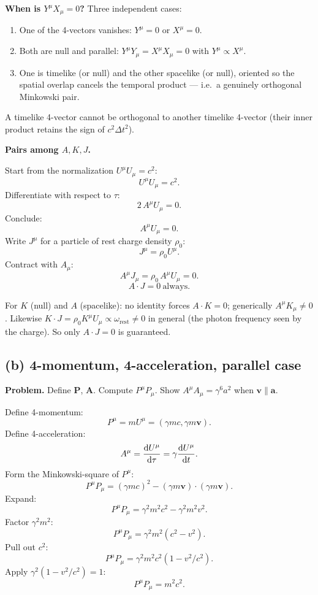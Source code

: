 \documentclass[11pt]{article}
\begin{document}
\noindent\textbf{When is $Y^\mu X_\mu=0$?} Three independent cases:
\begin{enumerate}
\item One of the 4-vectors vanishes: $Y^\mu=0$ or $X^\mu=0$.
\item Both are null and parallel: $Y^\mu Y_\mu = X^\mu X_\mu = 0$ with $Y^\mu \propto X^\mu$.
\item One is timelike (or null) and the other spacelike (or null), oriented so the spatial overlap cancels the temporal product --- i.e.\ a genuinely orthogonal Minkowski pair.
\end{enumerate}
A timelike 4-vector cannot be orthogonal to another timelike 4-vector (their inner product retains the sign of $c^2\Delta t^2$).

\noindent\textbf{Pairs among $A,K,J$.}

Start from the normalization $U^\mu U_\mu=c^2$:
\[ U^\mu U_\mu = c^2. \]
Differentiate with respect to $\tau$:
\[ 2\,A^\mu U_\mu = 0. \]
Conclude:
\[ A^\mu U_\mu = 0. \]
Write $J^\mu$ for a particle of rest charge density $\rho_0$:
\[ J^\mu = \rho_0 U^\mu. \]
Contract with $A_\mu$:
\[ A^\mu J_\mu = \rho_0\, A^\mu U_\mu = 0. \]
\[ \boxed{\;A\cdot J = 0\ \text{always}.\;} \]

\noindent For $K$ (null) and $A$ (spacelike): no identity forces $A\cdot K=0$; generically $A^\mu K_\mu\neq 0$. Likewise $K\cdot J = \rho_0 K^\mu U_\mu \propto \omega_\text{rest}\neq 0$ in general (the photon frequency seen by the charge). So only $A\cdot J=0$ is guaranteed.

\subsection*{(b) 4-momentum, 4-acceleration, parallel case}

\textbf{Problem.} Define $\bm P$, $\bm A$. Compute $P^\mu P_\mu$. Show $A^\mu A_\mu=\gamma^6 a^2$ when $\bm v\parallel\bm a$.

Define 4-momentum:
\[ P^\mu = m U^\mu = (\gamma mc,\gamma m\bm v). \]
Define 4-acceleration:
\[ A^\mu = \dv{U^\mu}{\tau} = \gamma\dv{U^\mu}{t}. \]
Form the Minkowski-square of $P^\mu$:
\[ P^\mu P_\mu = (\gamma mc)^2 - (\gamma m\bm v)\cdot(\gamma m\bm v). \]
Expand:
\[ P^\mu P_\mu = \gamma^2 m^2 c^2 - \gamma^2 m^2 v^2. \]
Factor $\gamma^2 m^2$:
\[ P^\mu P_\mu = \gamma^2 m^2 (c^2-v^2). \]
Pull out $c^2$:
\[ P^\mu P_\mu = \gamma^2 m^2 c^2(1-v^2/c^2). \]
Apply $\gamma^2(1-v^2/c^2)=1$:
\[ \boxed{\;P^\mu P_\mu = m^2 c^2.\;} \]
\end{document}
